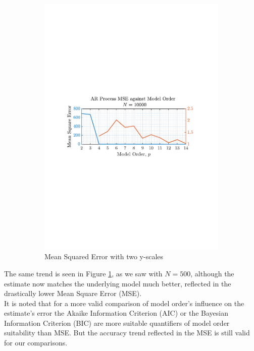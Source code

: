 \documentclass[12pt]{article}
\numberwithin{equation}{section}
\begin{document}
\begin{figure}[H]
\begin{subfigure}{0.49\textwidth}
			\includegraphics[trim={2.2cm 11.2cm 3cm  11.2cm}, clip, width=\textwidth]{../MATLAB/figures/q1_4c_fig16.pdf} 
			\captionsetup{justification=centering}
			\caption{Mean Squared Error with two y-scales}
		\end{subfigure}
		\captionsetup{justification=centering}
		\caption{}
		\label{fig: 1-4c}
	\end{figure}

	The same trend is seen in Figure \ref{fig: 1-4c}, as we saw with $N=500$, although the estimate now matches the underlying model much better, reflected in the drastically lower Mean Square Error (MSE). \\
	
	It is noted that for a more valid comparison of model order's influence on the estimate's error the Akaike Information Criterion (AIC) or the Bayesian Information Criterion (BIC) are more suitable quantifiers of model order suitability than MSE. But the accuracy trend reflected in the MSE is still valid for our comparisons.
	
\end{document}
